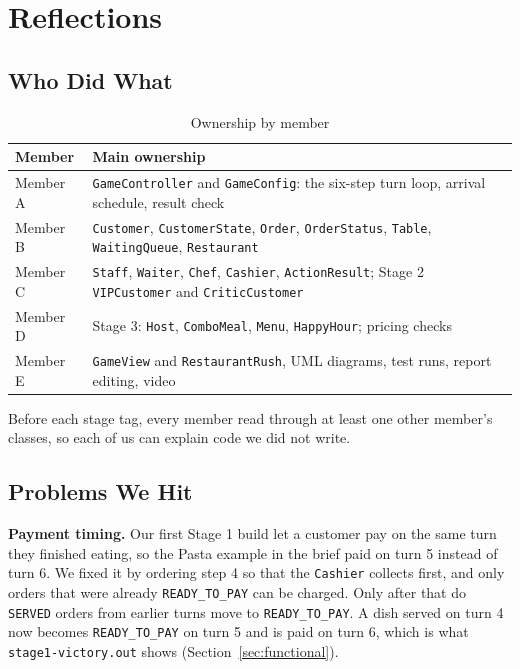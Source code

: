 \section{Reflections}
\label{sec:reflections}

\subsection{Who Did What}

\begin{table}[H]
\centering
\small
\begin{tabularx}{\textwidth}{lX}
\toprule
\textbf{Member} & \textbf{Main ownership} \\
\midrule
Member A & \texttt{GameController} and \texttt{GameConfig}: the six-step turn loop, arrival schedule, result check \\
Member B & \texttt{Customer}, \texttt{CustomerState}, \texttt{Order}, \texttt{OrderStatus}, \texttt{Table}, \texttt{WaitingQueue}, \texttt{Restaurant} \\
Member C & \texttt{Staff}, \texttt{Waiter}, \texttt{Chef}, \texttt{Cashier}, \texttt{ActionResult}; Stage 2 \texttt{VIPCustomer} and \texttt{CriticCustomer} \\
Member D & Stage 3: \texttt{Host}, \texttt{ComboMeal}, \texttt{Menu}, \texttt{HappyHour}; pricing checks \\
Member E & \texttt{GameView} and \texttt{RestaurantRush}, UML diagrams, test runs, report editing, video \\
\bottomrule
\end{tabularx}
\caption{Ownership by member}
\end{table}

Before each stage tag, every member read through at least one other member's classes, so each of us can explain code we did not write.

\subsection{Problems We Hit}

\textbf{Payment timing.} Our first Stage 1 build let a customer pay on the same turn they finished eating, so the Pasta example in the brief paid on turn 5 instead of turn 6. We fixed it by ordering step 4 so that the \texttt{Cashier} collects first, and only orders that were already \texttt{READY\_TO\_PAY} can be charged. Only after that do \texttt{SERVED} orders from earlier turns move to \texttt{READY\_TO\_PAY}. A dish served on turn 4 now becomes \texttt{READY\_TO\_PAY} on turn 5 and is paid on turn 6, which is what \texttt{stage1-victory.out} shows (Section~\ref{sec:functional}).


